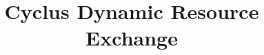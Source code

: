 \documentclass{ntmanuscript}
\title{Cyclus Dynamic Resource Exchange}
\date{}
\begin{document}






\cite{gidden_agent-based_2013}



\end{document}
